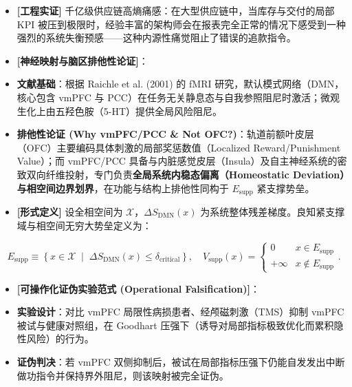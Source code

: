 \documentclass[11pt,a4paper,oneside]{ctexart}
\begin{document}
\begin{itemize}\item \textbf{[工程实证]} 千亿级供应链高熵痛感：在大型供应链中，当库存与交付的局部 KPI 被压到极限时，经验丰富的架构师会在报表完全正常的情况下感受到一种强烈的系统失衡预感------这种内源性痛觉阻止了错误的追款指令。\end{itemize}
\begin{itemize}\item \textbf{[神经映射与脑区排他性论证]}：\end{itemize}
\begin{itemize}\item \textbf{文献基础}：根据 Raichle et al. (2001) 的 fMRI 研究，默认模式网络（DMN，核心包含 vmPFC 与 PCC）在任务无关静息态与自我参照阻尼时激活；微观生化上由五羟色胺（5-HT）提供全局风险阻尼。\end{itemize}
\begin{itemize}\item \textbf{排他性论证 (Why vmPFC/PCC \& Not OFC?)}：轨道前额叶皮层（OFC）主要编码具体刺激的局部奖惩数值（Localized Reward/Punishment Value）；而 vmPFC/PCC 具备与内脏感觉皮层（Insula）及自主神经系统的密致双向纤维投射，专门负责\textbf{全局系统内稳态偏离（Homeostatic Deviation）与相空间边界划界}，在功能与结构上排他性同构于 $E_{\text{supp}}$ 紧支撑势垒。\end{itemize}
\begin{itemize}\item \textbf{[形式定义]} 设全相空间为 $\mathcal{X}$，$\Delta S_{\text{DMN}}(x)$ 为系统整体残差梯度。良知紧支撑域与相空间无穷大势垒定义为：\end{itemize}
\begin{equation}
E_{\text{supp}} \equiv \left\{ x \in \mathcal{X} \;\middle|\; \Delta S_{\text{DMN}}(x) \le \delta_{\text{critical}} \right\}, \quad V_{\text{supp}}(x) = \begin{cases} 0 & x \in E_{\text{supp}} \\ +\infty & x \notin E_{\text{supp}} \end{cases}.
\end{equation}
\begin{itemize}\item \textbf{[可操作化证伪实验范式 (Operational Falsification)]}：\end{itemize}
\begin{itemize}\item \textbf{实验设计}：对比 vmPFC 局限性病损患者、经颅磁刺激（TMS）抑制 vmPFC 被试与健康对照组，在 Goodhart 压强下（诱导对局部指标极致优化而累积隐性风险）的行为。\end{itemize}
\begin{itemize}\item \textbf{证伪判决}：若 vmPFC 双侧抑制后，被试在局部指标压强下仍能自发发出中断做功指令并保持界外阻尼，则该映射被完全证伪。\end{itemize}
\end{document}
